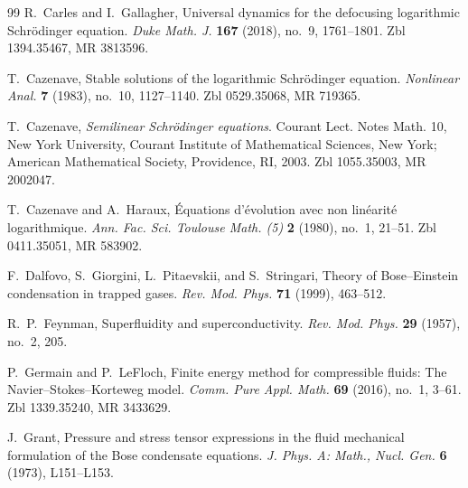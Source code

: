 \documentclass[11pt]{article}
\begin{document}
\begin{thebibliography}{99}
R.~Carles and I.~Gallagher,
\newblock Universal dynamics for the defocusing logarithmic Schr\"odinger equation.
\newblock \emph{Duke Math. J.} \textbf{167} (2018), no.~9, 1761--1801.
\newblock Zbl 1394.35467, MR 3813596.

T.~Cazenave,
\newblock Stable solutions of the logarithmic Schr\"odinger equation.
\newblock \emph{Nonlinear Anal.} \textbf{7} (1983), no.~10, 1127--1140.
\newblock Zbl 0529.35068, MR 719365.

T.~Cazenave,
\newblock \emph{Semilinear Schr\"odinger equations}.
\newblock Courant Lect. Notes Math. 10, New York University, Courant Institute of Mathematical Sciences, New York; American Mathematical Society, Providence, RI, 2003.
\newblock Zbl 1055.35003, MR 2002047.

T.~Cazenave and A.~Haraux,
\newblock \'Equations d'\'evolution avec non lin\'earit\'e logarithmique.
\newblock \emph{Ann. Fac. Sci. Toulouse Math. (5)} \textbf{2} (1980), no.~1, 21--51.
\newblock Zbl 0411.35051, MR 583902.



F.~Dalfovo, S.~Giorgini, L.~Pitaevskii, and S.~Stringari,
\newblock Theory of Bose--Einstein condensation in trapped gases.
\newblock \emph{Rev. Mod. Phys.} \textbf{71} (1999), 463--512.

R.~P.~Feynman,
\newblock Superfluidity and superconductivity.
\newblock \emph{Rev. Mod. Phys.} \textbf{29} (1957), no.~2, 205.

P.~Germain and P.~LeFloch,
\newblock Finite energy method for compressible fluids: The Navier--Stokes--Korteweg model.
\newblock \emph{Comm. Pure Appl. Math.} \textbf{69} (2016), no.~1, 3--61.
\newblock Zbl 1339.35240, MR 3433629.

J.~Grant,
\newblock Pressure and stress tensor expressions in the fluid mechanical formulation of the Bose condensate equations.
\newblock \emph{J. Phys. A: Math., Nucl. Gen.} \textbf{6} (1973), L151--L153.


\end{thebibliography}
\end{document}
